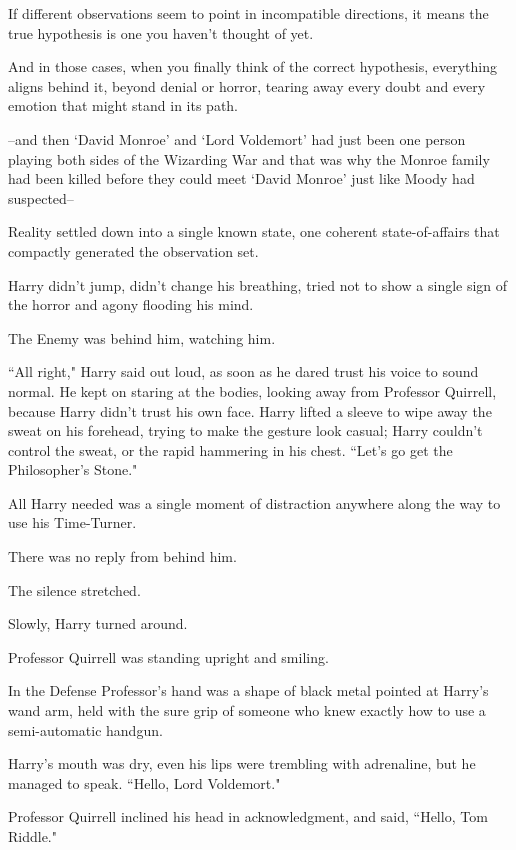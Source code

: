 If different observations seem to point in incompatible directions, it means the true hypothesis is one you haven't thought of yet.

And in those cases, when you finally think of the correct hypothesis, everything aligns behind it, beyond denial or horror, tearing away every doubt and every emotion that might stand in its path.

\---and then `David Monroe' and `Lord Voldemort' had just been one person playing both sides of the Wizarding War and that was why the Monroe family had been killed before they could meet `David Monroe' just like Moody had suspected\---

Reality settled down into a single known state, one coherent state-of-affairs that compactly generated the observation set.

Harry didn't jump, didn't change his breathing, tried not to show a single sign of the horror and agony flooding his mind.

The Enemy was behind him, watching him.

``All right," Harry said out loud, as soon as he dared trust his voice to sound normal. He kept on staring at the bodies, looking away from Professor Quirrell, because Harry didn't trust his own face. Harry lifted a sleeve to wipe away the sweat on his forehead, trying to make the gesture look casual; Harry couldn't control the sweat, or the rapid hammering in his chest. ``Let's go get the Philosopher's Stone."

All Harry needed was a single moment of distraction anywhere along the way to use his Time-Turner.

There was no reply from behind him.

The silence stretched.

Slowly, Harry turned around.

Professor Quirrell was standing upright and smiling.

In the Defense Professor's hand was a shape of black metal pointed at Harry's wand arm, held with the sure grip of someone who knew exactly how to use a semi-automatic handgun.

Harry's mouth was dry, even his lips were trembling with adrenaline, but he managed to speak. ``Hello, Lord Voldemort."

Professor Quirrell inclined his head in acknowledgment, and said, ``Hello, Tom Riddle."

